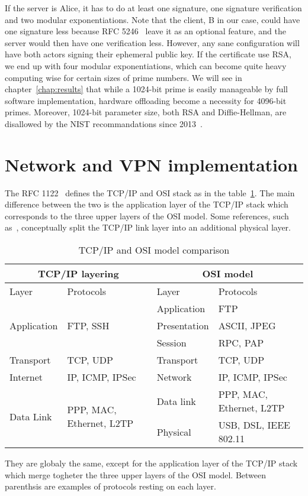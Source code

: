 If the server is Alice, it has to do at least one signature, one signature verification and two modular exponentiations.
Note that the client, B in our case, could have one signature less because RFC 5246~\cite{rfc5246} leave it as an optional feature, and the server would then have one verification less.
However, any sane configuration will have both actors signing their ephemeral public key.
If the certificate use RSA, we end up with four modular exponentiations, which can become quite heavy computing wise for certain sizes of prime numbers.
We will see in chapter~\ref{chap:results} that while a 1024-bit prime is easily manageable by full software implementation, hardware offloading become a necessity for 4096-bit primes.
Moreover, 1024-bit parameter size, both RSA and Diffie-Hellman, are disallowed by the NIST recommandations since 2013~\cite{nist-sp800-131A}.

\section{Network and VPN implementation}

The RFC 1122~\cite{rfc1122} defines the TCP/IP and OSI stack as in the table~\ref{tab:tcp-ip-stack}.
The main difference between the two is the application layer of the TCP/IP stack which corresponds to the three upper layers of the OSI model.
Some references, such as~\citet{tanenbaum2011}, conceptually split the TCP/IP link layer into an additional physical layer.

\begin{table}[ht]
\center
\begin{tabularx}{\textwidth}{|l|l|l|X|} \hline
\multicolumn{2}{|c|}{TCP/IP layering} & \multicolumn{2}{c|}{OSI model} \\ \hline
Layer & Protocols & Layer & Protocols \\ \hline
\multirow{3}{*}{Application} & \multirow{3}{*}{FTP, SSH} & Application & FTP \\ \cline{3-4}
 & & Presentation & ASCII, JPEG \\ \cline{3-4}
 & & Session & RPC, PAP \\ \hline
Transport & TCP, UDP & Transport & TCP, UDP \\ \hline
Internet & IP, ICMP, IPSec & Network & IP, ICMP, IPSec \\ \hline
\multirow{2}{*}{Data Link} & \multirow{2}{*}{PPP, MAC, Ethernet, L2TP} & Data link & PPP, MAC, Ethernet, L2TP \\ \cline{3-4}
 & & Physical & USB, DSL, IEEE 802.11 \\ \hline
\end{tabularx}
\caption{TCP/IP and OSI model comparison}{They are globaly the same, except for the application layer of the TCP/IP stack which merge togheter the three upper layers of the OSI model. Between parenthsis are examples of protocols resting on each layer.}
\label{tab:tcp-ip-stack}
\end{table}


